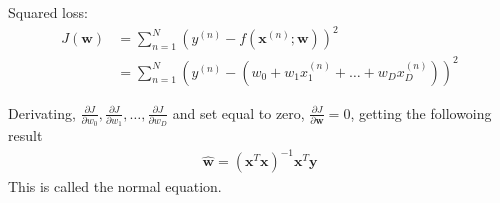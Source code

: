 \documentclass[a4paper, 11pt]{article}
\begin{document}
Squared loss:
\begin{align*}
    J(\mathbf{w}) &= \sum\limits_{n = 1}^{N}(y^{(n)} - f(\mathbf{x}^{(n)};\mathbf{w}))^2\\
    &= \sum\limits_{n = 1}^{N}(y^{(n)} - (w_0 + w_1x_1^{(n)} + \dots + w_Dx_D^{(n)}))^2
\end{align*}

Derivating, $\frac{\partial J}{\partial w_0}, \frac{\partial J}{\partial w_1},\dots, \frac{\partial J}{\partial w_D}$ and set equal to zero, $\frac{\partial J}{\partial\mathbf{w}} = 0$, getting the followoing result
\begin{align*}
    \mathbf{\hat{w}} = (\mathbf{x}^{T}\mathbf{x})^{-1}\mathbf{x}^{T}\mathbf{y}
\end{align*}
This is called the normal equation.
\end{document}
